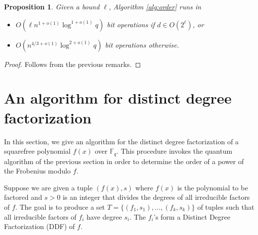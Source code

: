\documentclass{article}
\theoremstyle{plain}
\newtheorem{proposition}[theorem]{Proposition}
\theoremstyle{definition}
\def\F{\ensuremath{\mathbb{F}}}
\begin{document}
\begin{proposition}
	\label{prop:exact-d}
	Given a bound $\ell$, Algorithm \ref{alg:order} runs in
	\begin{itemize}
		\item $O(\ell n^{1 + o(1)}\log^{1 + o(1)}q)$ bit operations if $d \in O(2^\ell)$, or
		\item $O(n^{4 / 3 + o(1)}\log^{2 + o(1)}q)$ bit operations otherwise.
	\end{itemize}
\end{proposition}
\begin{proof}
	Follows from the previous remarks.
\end{proof}



\section{An algorithm for distinct degree factorization}

In this section, we give an algorithm for the distinct degree factorization of a squarefree 
polynomial $f(x)$ over $\F_q$. This procedure invokes the quantum algorithm of the previous section 
in order to determine the order of a power of the Frobenius modulo $f$.

Suppose we are given a tuple $(f(x), s)$ where $f(x)$ is the polynomial to be factored and $s > 0$ 
is an integer that divides the degrees of all irreducible factors of $f$. The goal is to produce a
set $T = \{ (f_1, s_1), \dots, (f_k, s_k) \}$ of tuples such that all irreducible factors of $f_i$ 
have degree $s_i$. The $f_i$'s form a Distinct Degree Factorization (DDF) of $f$.
\end{document}

